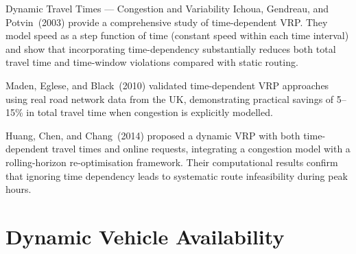\documentclass[aspectratio=169,10pt]{beamer}
\begin{document}
\begin{frame}[allowframebreaks]{Dynamic Travel Times — Congestion and Variability}
  Ichoua, Gendreau, and Potvin~(2003) provide a comprehensive study of
  time-dependent VRP.  They model speed as a step function of time
  (constant speed within each time interval) and show that incorporating
  time-dependency substantially reduces both total travel time and
  time-window violations compared with static routing.

  Maden, Eglese, and Black~(2010) validated time-dependent VRP approaches
  using real road network data from the UK, demonstrating practical savings
  of 5--15\% in total travel time when congestion is explicitly modelled.

  Huang, Chen, and Chang~(2014) proposed a dynamic VRP with both time-dependent
  travel times and online requests, integrating a congestion model with
  a rolling-horizon re-optimisation framework.  Their computational results
  confirm that ignoring time dependency leads to systematic route infeasibility
  during peak hours.

\end{frame}

\section{Dynamic Vehicle Availability}
\end{document}
